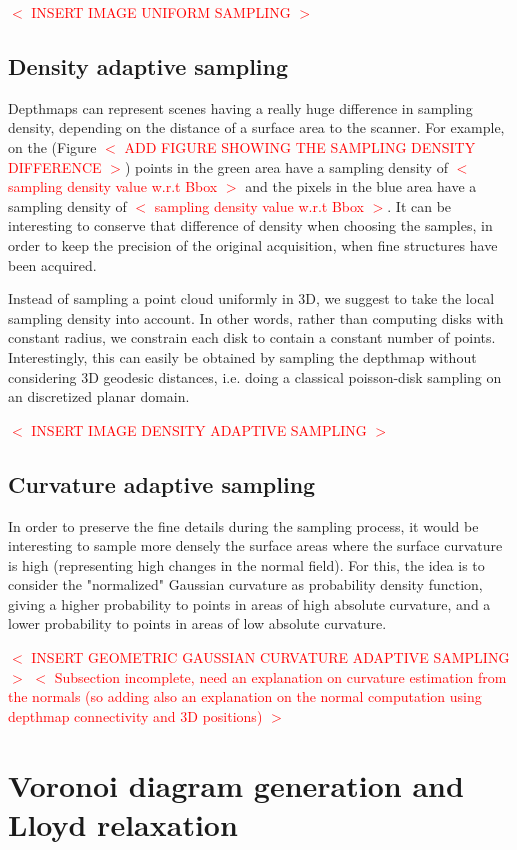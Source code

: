 \documentclass[11pt,fleqn]{book} %
\newcommand{\arnaud}[1]{\textcolor{red}{$<$ #1 $>$}}
\begin{document}
\arnaud{INSERT IMAGE UNIFORM SAMPLING}

\subsection{Density adaptive sampling}
Depthmaps can represent scenes having a really huge difference in sampling density, depending on the distance of a surface area to the scanner. 
For example, on the (Figure \arnaud{ADD FIGURE SHOWING THE SAMPLING DENSITY DIFFERENCE}) points in the green area have a sampling density of \arnaud{sampling density value w.r.t Bbox} and the pixels in the blue area have a sampling density of \arnaud{sampling density value w.r.t Bbox}. It can be interesting to conserve that difference of density when choosing the samples, in order to keep the precision of the original acquisition, when fine structures have been acquired.

Instead of sampling a point cloud uniformly in 3D, we suggest to take the local sampling density into account. In other words, rather than computing disks with constant radius, we constrain each disk to contain a constant number of points.
Interestingly, this can easily be obtained by sampling the depthmap without considering 3D geodesic distances, i.e. doing a classical poisson-disk sampling on an discretized planar domain.

\arnaud{INSERT IMAGE DENSITY ADAPTIVE SAMPLING}

\subsection{Curvature adaptive sampling}
In order to preserve the fine details during the sampling process, it would be interesting to sample more densely the surface areas where the surface curvature is high (representing high changes in the normal field). For this, the idea is to consider the "normalized" Gaussian curvature as probability density function, giving a higher probability to points in areas of high absolute curvature, and a lower probability to points in areas of low absolute curvature.

\arnaud{INSERT GEOMETRIC GAUSSIAN CURVATURE ADAPTIVE SAMPLING}
\arnaud{Subsection incomplete, need an explanation on curvature estimation from the normals (so adding also an explanation on the normal computation using depthmap connectivity and 3D positions)}

\section{Voronoi diagram generation and Lloyd relaxation}
\label{sec:lloyd_relaxation}
\end{document}
